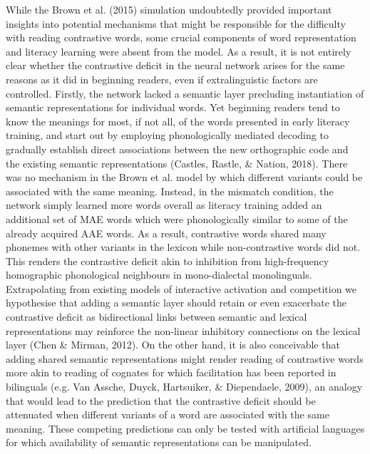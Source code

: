 \documentclass[doc,floatsintext]{apa6}
\begin{document}
While the Brown et al. (2015) simulation undoubtedly provided important
insights into potential mechanisms that might be responsible for the
difficulty with reading contrastive words, some crucial components of
word representation and literacy learning were absent from the model. As
a result, it is not entirely clear whether the contrastive deficit in
the neural network arises for the same reasons as it did in beginning
readers, even if extralinguistic factors are controlled. Firstly, the
network lacked a semantic layer precluding instantiation of semantic
representations for individual words. Yet beginning readers tend to know
the meanings for most, if not all, of the words presented in early
literacy training, and start out by employing phonologically mediated
decoding to gradually establish direct associations between the new
orthographic code and the existing semantic representations (Castles,
Rastle, \& Nation, 2018). There was no mechanism in the Brown et al.
model by which different variants could be associated with the same
meaning. Instead, in the mismatch condition, the network simply learned
more words overall as literacy training added an additional set of MAE
words which were phonologically similar to some of the already acquired
AAE words. As a result, contrastive words shared many phonemes with
other variants in the lexicon while non-contrastive words did not. This
renders the contrastive deficit akin to inhibition from high-frequency
homographic phonological neighbours in mono-dialectal monolinguals.
Extrapolating from existing models of interactive activation and
competition we hypothesise that adding a semantic layer should retain or
even exacerbate the contrastive deficit as bidirectional links between
semantic and lexical representations may reinforce the non-linear
inhibitory connections on the lexical layer (Chen \& Mirman, 2012). On
the other hand, it is also conceivable that adding shared semantic
representations might render reading of contrastive words more akin to
reading of cognates for which facilitation has been reported in
bilinguals (e.g. Van Assche, Duyck, Hartsuiker, \& Diependaele, 2009),
an analogy that would lead to the prediction that the contrastive
deficit should be attenuated when different variants of a word are
associated with the same meaning. These competing predictions can only
be tested with artificial languages for which availability of semantic
representations can be manipulated.
\end{document}

